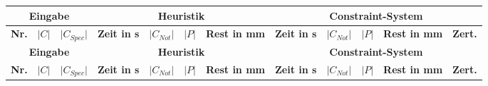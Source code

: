 \begin{landscape}
        \begin{longtable}{|c|c|c||c|c|c|c||c|c|c|c|c|}
                \hline
                \multicolumn{3}{|c||}{\textbf{Eingabe}} & \multicolumn{4}{c||}{\textbf{Heuristik}} & \multicolumn{5}{c|}{\textbf{Constraint-System}} \\
                \hline
                \textbf{Nr.} & \textbf{$\lvert C \rvert$} & \textbf{$\lvert C_{Spec} \rvert$} & \textbf{Zeit in s} & \textbf{$\lvert C_{Not} \rvert$} & \textbf{$\lvert P \rvert$} & \textbf{Rest in mm} & \textbf{Zeit in s} & \textbf{$\lvert C_{Not} \rvert$} & \textbf{$\lvert P \rvert$} & \textbf{Rest in mm} & \textbf{Zert.} \\
                \hline
                \endfirsthead

                \hline
                \multicolumn{3}{|c||}{\textbf{Eingabe}} & \multicolumn{4}{c||}{\textbf{Heuristik}} & \multicolumn{5}{c|}{\textbf{Constraint-System}} \\
                \hline
                \textbf{Nr.} & \textbf{$\lvert C \rvert$} & \textbf{$\lvert C_{Spec} \rvert$} & \textbf{Zeit in s} & \textbf{$\lvert C_{Not} \rvert$} & \textbf{$\lvert P \rvert$} & \textbf{Rest in mm} & \textbf{Zeit in s} & \textbf{$\lvert C_{Not} \rvert$} & \textbf{$\lvert P \rvert$} & \textbf{Rest in mm} & \textbf{Zert.} \\
                \hline
                \endhead


\end{longtable}
\end{landscape}
